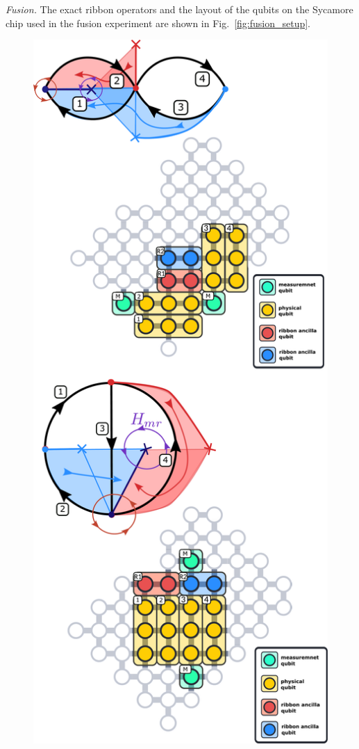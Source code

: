 \documentclass[a4paper,twocolumn,11pt, accepted=2024-06-14]{quantumarticle}
\begin{document}
\emph{Fusion.} 
The exact ribbon operators and the layout of the qubits on the Sycamore chip used in the fusion experiment are shown in Fig.~\ref{fig:fusion_setup}.
\begin{figure}
	\centering
	\includegraphics[width=\linewidth]{Figures/basket_fusion.pdf}

\end{figure}
\end{document}
